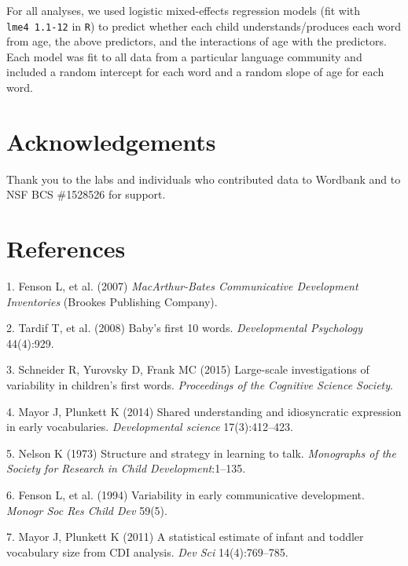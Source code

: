 \documentclass[english,man]{apa6}
\theoremstyle{definition}
\theoremstyle{definition}
\theoremstyle{definition}
\theoremstyle{remark}
\begin{document}
For all analyses, we used logistic mixed-effects regression models (fit
with \texttt{lme4\ 1.1-12} in \texttt{R}) to predict whether each child
understands/produces each word from age, the above predictors, and the
interactions of age with the predictors. Each model was fit to all data
from a particular language community and included a random intercept for
each word and a random slope of age for each word.

\section{Acknowledgements}\label{acknowledgements}

Thank you to the labs and individuals who contributed data to Wordbank
and to NSF BCS \#1528526 for support.

\newpage

\section{References}\label{references}

\setlength{\parindent}{-0.5in} \setlength{\leftskip}{0.5in}

\hypertarget{refs}{}
\hypertarget{ref-fenson2007}{}
1. Fenson L, et al. (2007) \emph{MacArthur-Bates Communicative
Development Inventories} (Brookes Publishing Company).

\hypertarget{ref-tardif2008}{}
2. Tardif T, et al. (2008) Baby's first 10 words. \emph{Developmental
Psychology} 44(4):929.

\hypertarget{ref-schneider2015}{}
3. Schneider R, Yurovsky D, Frank MC (2015) Large-scale investigations
of variability in children's first words. \emph{Proceedings of the
Cognitive Science Society}.

\hypertarget{ref-mayor2014}{}
4. Mayor J, Plunkett K (2014) Shared understanding and idiosyncratic
expression in early vocabularies. \emph{Developmental science}
17(3):412--423.

\hypertarget{ref-nelson1973}{}
5. Nelson K (1973) Structure and strategy in learning to talk.
\emph{Monographs of the Society for Research in Child
Development}:1--135.

\hypertarget{ref-fenson1994}{}
6. Fenson L, et al. (1994) Variability in early communicative
development. \emph{Monogr Soc Res Child Dev} 59(5).

\hypertarget{ref-mayor2011}{}
7. Mayor J, Plunkett K (2011) A statistical estimate of infant and
toddler vocabulary size from CDI analysis. \emph{Dev Sci}
14(4):769--785.
\end{document}
